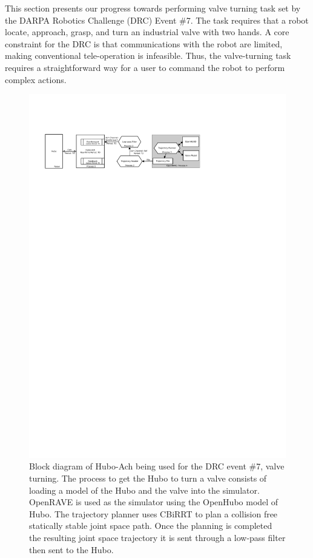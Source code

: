 This section presents our progress towards performing valve turning task set by the DARPA Robotics Challenge (DRC) Event \#7\cite{drc}. 
The task requires that a robot locate, approach, grasp, and turn an industrial valve with two hands.
A core constraint for the DRC is that communications with the robot are limited, making conventional tele-operation is infeasible.
Thus, the valve-turning task requires a straightforward way for a user to command the robot to perform complex actions. 

\begin{figure}[thpb]
  \centering

      \includegraphics[width=1.0\columnwidth]{./examples/pix/hubo-ach-diagram-openhubo-valve.pdf}

\caption{Block diagram of Hubo-Ach being used for the DRC event \#7, valve turning.  
The process to get the Hubo to turn a valve consists of loading a model of the Hubo and the valve into the simulator.  
OpenRAVE is used as the simulator using the OpenHubo model of Hubo.  
The trajectory planner uses CBiRRT to plan a collision free statically stable joint space path.  
Once the planning is completed the resulting joint space trajectory it is sent through a low-pass filter then sent to the Hubo.}
  \label{fig:block-valve}
\end{figure}




